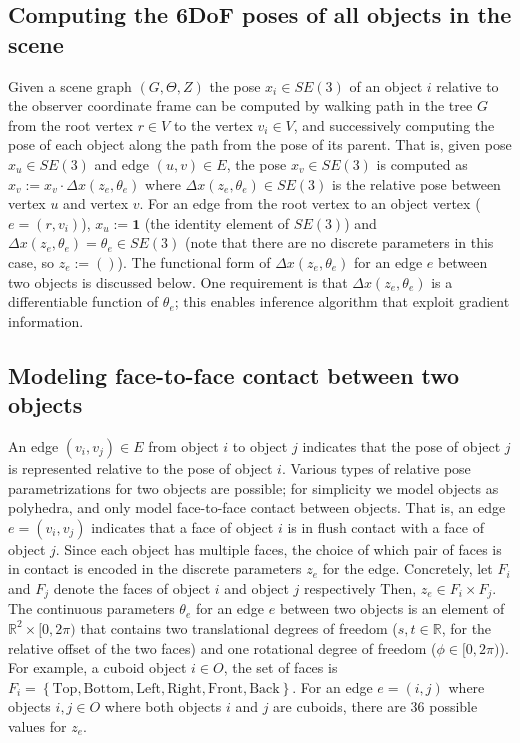 \subsection{Computing the 6DoF poses of all objects in the scene}
Given a scene graph $(G, \Theta, Z)$ the pose $x_i \in SE(3)$ of an object $i$ relative to the observer coordinate frame can be computed by walking path in the tree $G$ from the root vertex $r \in V$ to the vertex $v_i \in V$, and successively computing the pose of each object along the path from the pose of its parent.
That is, given pose $x_u \in SE(3)$ and edge $(u, v) \in E$, the pose $x_v \in SE(3)$ is computed as $x_v := x_v \cdot \Delta x(z_e, \theta_e)$ where $\Delta x(z_e, \theta_e) \in SE(3)$ is the relative pose between vertex $u$ and vertex $v$.
For an edge from the root vertex to an object vertex ($e = (r, v_i)$), $x_u := \mathbf{1}$ (the identity element of $SE(3)$) and $\Delta x(z_e, \theta_e) = \theta_e \in SE(3)$ (note that there are no discrete parameters in this case, so $z_e := ()$).
The functional form of $\Delta x(z_e, \theta_e)$ for an edge $e$ between two objects is discussed below.
One requirement is that $\Delta x(z_e, \theta_e)$ is a differentiable function of $\theta_e$; this enables inference algorithm that exploit gradient information.

\subsection{Modeling face-to-face contact between two objects}
An edge $(v_i, v_j) \in E$ from object $i$ to object $j$ indicates that the pose of object $j$ is represented relative to the pose of object $i$.
Various types of relative pose parametrizations for two objects are possible; for simplicity we model objects as polyhedra, and only model face-to-face contact between objects.
That is, an edge $e = (v_i, v_j)$ indicates that a face of object $i$ is in flush contact with a face of object $j$.
Since each object has multiple faces, the choice of which pair of faces is in contact is encoded in the discrete parameters $z_e$ for the edge.
Concretely, let $F_i$ and $F_j$ denote the faces of object $i$ and object $j$ respectively
Then, $z_e \in F_i \times F_j$.
The continuous parameters $\theta_e$ for an edge $e$ between two objects is an element of $\mathbb{R}^2 \times [0, 2 \pi)$ that contains two translational degrees of freedom ($s, t \in \mathbb{R}$, for the relative offset of the two faces) and one rotational degree of freedom ($\phi \in [0, 2 \pi)$).
For example, a cuboid object $i \in O$, the set of faces is $F_i = \left\{\mathrm{Top, Bottom, Left, Right, Front, Back}\right\}$.
For an edge $e = (i, j)$ where objects $i, j \in O$ where both objects $i$ and $j$ are cuboids, there are 36 possible values for $z_e$.

